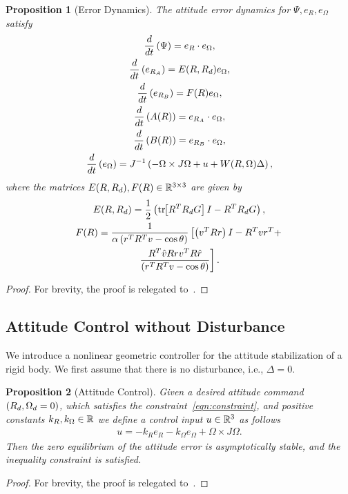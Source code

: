 \documentclass[letterpaper, 10 pt, conference]{ieeeconf}  %
\newtheorem{prop}{Proposition}
\begin{document}
\begin{prop}[Error Dynamics]\label{prop:error_dyn}
	The attitude error dynamics for \( \Psi, e_R, e_\Omega \) satisfy 
	\begin{gather}
		\frac{d }{d t} \left( \Psi \right) = e_R \cdot e_\Omega , \label{eqn:psi_dot}\\
		\frac{d }{d t} \left( e_{R_A} \right) = E(R, R_d) e_\Omega , \label{eqn:eRA_dot} \\
		\frac{d }{d t} \left( e_{R_B} \right) = F(R) e_\Omega , \label{eqn:eRB_dot} \\
		\frac{d }{d t} \left( A(R) \right) = e_{R_A} \cdot e_\Omega , \label{eqn:A_dot} \\
		\frac{d }{d t} \left( B(R) \right) = e_{R_B} \cdot e_\Omega , \label{eqn:B_dot} \\
		\frac{d }{d t} \left( e_\Omega \right) = J^{-1} \left( -\Omega \times J \Omega + u + W(R, \Omega) \Delta \right) , \label{eqn:eW_dot}
	\end{gather}
	where the matrices \(E(R,R_d), F(R) \in \mathbb{R}^{3\times3} \) are given by
	\begin{gather}
		E(R,R_d) = \frac{1}{2} \left( \mathrm{tr}\negthickspace\left[ R^T R_d G \right]I - R^T R_d G \right) , \label{eqn:E} \\
		F(R) = \frac{1}{\alpha \left( r^T R^T v - \cos \theta \right)} \left[\left( v^T R r \right) I - R^T v r^T + \right. \nonumber \\
		\left. \frac{R^T \hat{v} R r v^T R \hat{r}}{\left( r^T R^T v - \cos \theta \right)}\right] . \label{eqn:F}
	\end{gather}
\end{prop}
\begin{proof}
For brevity, the proof is relegated to~\cite{kulumani2016b}.
\end{proof}

\subsection{Attitude Control without Disturbance}
We introduce a nonlinear geometric controller for the attitude stabilization of a rigid body.
We first assume that there is no disturbance, i.e., \( \Delta = 0 \).
\begin{prop}[Attitude Control]\label{prop:att_control}
	Given a desired attitude command \( \left( R_d, \Omega_d = 0 \right) \), which satisfies the constraint~\cref{eqn:constraint}, and positive constants \( k_R, k_\Omega \in \mathbb{R} \) we define a control input \( u \in \mathbb{R}^3 \) as follows
	\begin{gather}
		u = -k_R e_R - k_\Omega e_\Omega + \Omega \times J \Omega . \label{eqn:nodist_control}
	\end{gather}
	Then the zero equilibrium of the attitude error is asymptotically stable, and the inequality constraint is satisfied.
\end{prop}
\begin{proof}
For brevity, the proof is relegated to~\cite{kulumani2016b}.
\end{proof}
\end{document}
